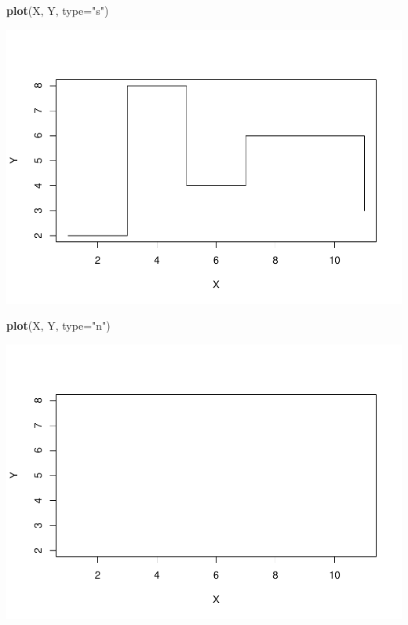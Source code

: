\documentclass[
]{book}
\newenvironment{Shaded}{\begin{snugshade}}{\end{snugshade}}
\newcommand{\DataTypeTok}[1]{\textcolor[rgb]{0.13,0.29,0.53}{#1}}
\newcommand{\KeywordTok}[1]{\textcolor[rgb]{0.13,0.29,0.53}{\textbf{#1}}}
\newcommand{\NormalTok}[1]{#1}
\newcommand{\StringTok}[1]{\textcolor[rgb]{0.31,0.60,0.02}{#1}}
\theoremstyle{definition}
\theoremstyle{definition}
\theoremstyle{definition}
\theoremstyle{remark}
\begin{document}
\begin{Shaded}
\begin{Highlighting}[]
\KeywordTok{plot}\NormalTok{(X, Y, }\DataTypeTok{type=}\StringTok{"s"}\NormalTok{)}
\end{Highlighting}
\end{Shaded}

\begin{center}\includegraphics[width=0.9\linewidth]{07chap06_Graficos_I_files/figure-latex/unnamed-chunk-10-1} \end{center}

\begin{Shaded}
\begin{Highlighting}[]
\KeywordTok{plot}\NormalTok{(X, Y, }\DataTypeTok{type=}\StringTok{"n"}\NormalTok{)}
\end{Highlighting}
\end{Shaded}

\begin{center}\includegraphics[width=0.9\linewidth]{07chap06_Graficos_I_files/figure-latex/unnamed-chunk-11-1} \end{center}
\end{document}
